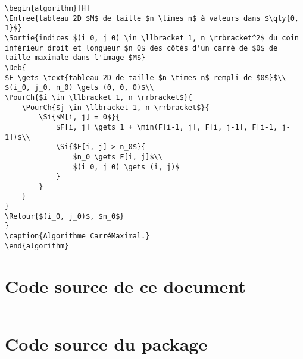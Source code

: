 \documentclass{article}
\begin{document}
\begin{verbatim}
\begin{algorithm}[H]
\Entree{tableau 2D $M$ de taille $n \times n$ à valeurs dans $\qty{0, 1}$}
\Sortie{indices $(i_0, j_0) \in \llbracket 1, n \rrbracket^2$ du coin inférieur droit et longueur $n_0$ des côtés d'un carré de $0$ de taille maximale dans l'image $M$}
\Deb{
$F \gets \text{tableau 2D de taille $n \times n$ rempli de $0$}$\\
$(i_0, j_0, n_0) \gets (0, 0, 0)$\\
\PourCh{$i \in \llbracket 1, n \rrbracket$}{
    \PourCh{$j \in \llbracket 1, n \rrbracket$}{
        \Si{$M[i, j] = 0$}{
            $F[i, j] \gets 1 + \min(F[i-1, j], F[i, j-1], F[i-1, j-1])$\\
            \Si{$F[i, j] > n_0$}{
                $n_0 \gets F[i, j]$\\
                $(i_0, j_0) \gets (i, j)$
            }
        }
    }
}
\Retour{$(i_0, j_0)$, $n_0$}
}
\caption{Algorithme CarréMaximal.}
\end{algorithm}
\end{verbatim}

\clearpage
\section{Code source de ce document}
\inputminted[fontsize=\small]{latex}{enssdm.tex}

\clearpage
\section{Code source du package }
\inputminted[fontsize=\small]{latex}{enssdm.sty}
\end{document}
